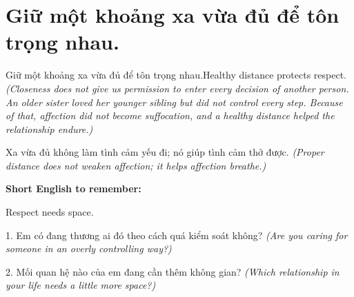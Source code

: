\section{Giữ một khoảng xa vừa đủ để tôn trọng nhau.}
\begin{truyen}{Giữ một khoảng xa vừa đủ để tôn trọng nhau.}{Healthy distance protects respect.}
\textit{(Closeness does not give us permission to enter every decision of another person. An older sister loved her younger sibling but did not control every step. Because of that, affection did not become suffocation, and a healthy distance helped the relationship endure.)}
\end{truyen}
\begin{baihoc}
Xa vừa đủ không làm tình cảm yếu đi; nó giúp tình cảm thở được.
\textit{(Proper distance does not weaken affection; it helps affection breathe.)}
\end{baihoc}
\begin{ghinhoanh}
\textbf{Short English to remember:}

Respect needs space.
\end{ghinhoanh}
\begin{tuhocnhanh}
1. Em có đang thương ai đó theo cách quá kiểm soát không? \textit{(Are you caring for someone in an overly controlling way?)}

2. Mối quan hệ nào của em đang cần thêm không gian? \textit{(Which relationship in your life needs a little more space?)}
\end{tuhocnhanh}
\ngancach
